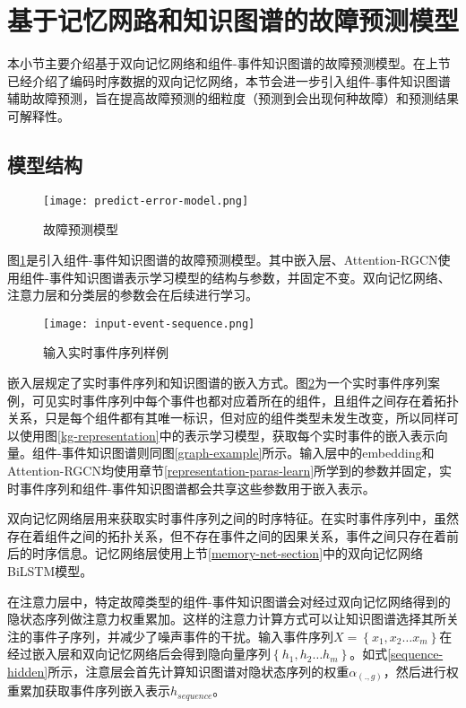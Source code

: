 \section{基于记忆网路和知识图谱的故障预测模型}\label{kg-pre-error}
本小节主要介绍基于双向记忆网络和组件-事件知识图谱的故障预测模型。在上节已经介绍了编码时序数据的双向记忆网络，本节会进一步引入组件-事件知识图谱辅助故障预测，旨在提高故障预测的细粒度（预测到会出现何种故障）和预测结果可解释性。
\subsection{模型结构}
\begin{figure}[htbp]
    \centering
    \texttt{[image: predict-error-model.png]}
    \caption{故障预测模型\label{predict-error-model}}
\end{figure}
图\ref{predict-error-model}是引入组件-事件知识图谱的故障预测模型。其中嵌入层、Attention-RGCN使用组件-事件知识图谱表示学习模型的结构与参数，并固定不变。双向记忆网络、注意力层和分类层的参数会在后续进行学习。
\begin{figure}[htbp]
    \centering
    \texttt{[image: input-event-sequence.png]}
    \caption{输入实时事件序列样例\label{input-event-sequence}}
\end{figure}

嵌入层规定了实时事件序列和知识图谱的嵌入方式。图\ref{input-event-sequence}为一个实时事件序列案例，可见实时事件序列中每个事件也都对应着所在的组件，且组件之间存在着拓扑关系，只是每个组件都有其唯一标识，但对应的组件类型未发生改变，所以同样可以使用图\ref{kg-representation}中的表示学习模型，获取每个实时事件的嵌入表示向量。组件-事件知识图谱则同图\ref{graph-example}所示。输入层中的embedding和Attention-RGCN均使用章节\ref{representation-paras-learn}所学到的参数并固定，实时事件序列和组件-事件知识图谱都会共享这些参数用于嵌入表示。

双向记忆网络层用来获取实时事件序列之间的时序特征。在实时事件序列中，虽然存在着组件之间的拓扑关系，但不存在事件之间的因果关系，事件之间只存在着前后的时序信息。记忆网络层使用上节\ref{memory-net-section}中的双向记忆网络BiLSTM模型。

在注意力层中，特定故障类型的组件-事件知识图谱会对经过双向记忆网络得到的隐状态序列做注意力权重累加。这样的注意力计算方式可以让知识图谱选择其所关注的事件子序列，并减少了噪声事件的干扰。输入事件序列$X=\left\{x_{1}, x_{2} \ldots x_{m}\right\}$在经过嵌入层和双向记忆网络后会得到隐向量序列$\left\{h_{1}, h_{2} \ldots h_{m}\right\}$。如式\ref{sequence-hidden}所示，注意层会首先计算知识图谱对隐状态序列的权重$\alpha_{(. , g)}$，然后进行权重累加获取事件序列嵌入表示$h_{sequence}$。

